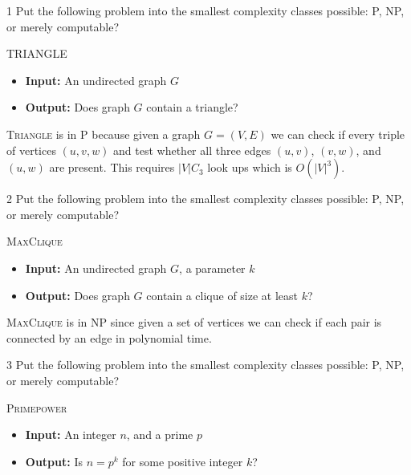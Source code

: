 \documentclass[12pt]{article}
\begin{document}


\begin{problem}{1}
Put the following problem into the smallest complexity classes possible: P, NP, or merely computable?

\begin{tcolorbox}
\textsc{TRIANGLE}
\begin{itemize}
    \item \textbf{Input:} An undirected graph $G$
    \item \textbf{Output:} Does graph $G$ contain a triangle?
\end{itemize}
\end{tcolorbox}

\end{problem}

\begin{solution}
    \bbni
    \textsc{Triangle} is in P because given a graph $G = (V,E)$ we can check if every triple of vertices $(u,v,w)$ and test whether all three edges $(u,v)$, $(v,w)$, and $(u,w)$ are present. This requires $|V| C_3$ look ups which is $O(|V|^3)$.
\end{solution}


\begin{problem}{2}
Put the following problem into the smallest complexity classes possible: P, NP, or merely computable?
\begin{tcolorbox}
\textsc{MaxClique}
\begin{itemize}
    \item \textbf{Input:} An undirected graph $G$, a parameter $k$
    \item \textbf{Output:} Does graph $G$ contain a clique of size at least $k$?
\end{itemize}
\end{tcolorbox}
\end{problem}

\begin{solution}
    \bbni
    \textsc{MaxClique} is in NP since given a set of vertices we can check if each pair is connected by an edge in polynomial time. 

\end{solution}

\newpage 

\begin{problem}{3}
Put the following problem into the smallest complexity classes possible: P, NP, or merely computable?
\begin{tcolorbox}
\textsc{Primepower}
\begin{itemize}
    \item \textbf{Input:} An integer $n$, and a prime $p$
    \item \textbf{Output:} Is $n = p^k$ for some positive integer $k$?
\end{itemize}
\end{tcolorbox}
\end{problem}
\end{document}
